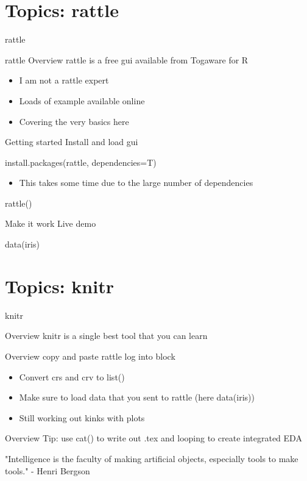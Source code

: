 \documentclass[xcolor=dvipsnames]{beamer}
\begin{document}
\section{Topics: rattle}
\begin{frame}[t,allowframebreaks]{rattle}
\begin{block}{rattle Overview }
rattle is a free gui available from Togaware for R
\end{block}

\begin{itemize}
\item I am not a rattle expert
\item Loads of example available online
\item Covering the very basics here
\end{itemize}
\begin{block}{Getting started }
Install and load gui
\end{block}

install.packages(rattle, dependencies=T)

\begin{itemize}
\item This takes some time due to the large number of dependencies
\end{itemize}
rattle()

\begin{block}{Make it work}
Live demo
\end{block}
data(iris)

\end{frame}


\section{Topics: knitr}
\begin{frame}[t,allowframebreaks]{knitr}
\begin{block}{Overview }
knitr is a single best tool that you can learn
\end{block}
\begin{block}{Overview }
copy and paste rattle log into block
\end{block}

\begin{itemize}
\item Convert crs and crv to list()
\item Make sure to load data that you sent to rattle (here data(iris))
\item Still working out kinks with plots
\end{itemize}
\begin{block}{Overview }
Tip: use cat() to write out .tex and looping to create integrated EDA
\end{block}
"Intelligence is the faculty of making artificial objects, especially tools to make tools." - Henri Bergson
\end{frame}
\end{document}
